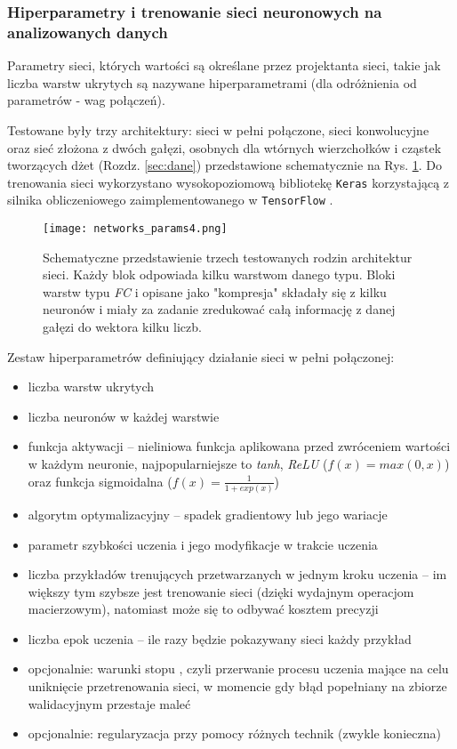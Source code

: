 \subsubsection*{Hiperparametry i trenowanie sieci neuronowych na analizowanych danych}

Parametry sieci, których wartości są określane przez projektanta sieci, takie jak liczba warstw ukrytych są nazywane hiperparametrami (dla odróżnienia od parametrów - wag połączeń).

Testowane były trzy architektury: sieci w pełni połączone, sieci konwolucyjne oraz sieć złożona z dwóch gałęzi, osobnych dla wtórnych wierzchołków i cząstek tworzących dżet (Rozdz. \ref{sec:dane}) przedstawione schematycznie na Rys. \ref{fig:nets-params}.
Do trenowania sieci wykorzystano wysokopoziomową bibliotekę \texttt{Keras} \cite{chollet15} korzystającą z silnika obliczeniowego zaimplementowanego w \texttt{TensorFlow} \cite{tensorflow15}.

\begin{figure}[ht]
	\centering
	\texttt{[image: networks\_params4.png]}
	\caption{Schematyczne przedstawienie trzech testowanych rodzin architektur sieci. Każdy blok odpowiada kilku warstwom danego typu. Bloki warstw typu \textit{FC}  i opisane jako "kompresja" składały się z kilku neuronów i miały za zadanie zredukować całą informację z danej gałęzi do wektora kilku liczb.}
	\label{fig:nets-params}
\end{figure}

\clearpage
Zestaw hiperparametrów definiujący działanie sieci w pełni połączonej: 
\begin{itemize}
	\item liczba warstw ukrytych 
	\item liczba neuronów w każdej warstwie
	\item funkcja aktywacji -- nieliniowa funkcja aplikowana przed zwróceniem wartości w każdym neuronie, najpopularniejsze to \textit{tanh}, \textit{ReLU} ($f(x) = max(0,x)$) oraz funkcja sigmoidalna ($f(x) = \frac{1}{1+exp(x)}$)
	\item algorytm optymalizacyjny -- spadek gradientowy lub jego wariacje
	\item parametr szybkości uczenia i jego modyfikacje w trakcie uczenia
	\item liczba przykładów trenujących przetwarzanych w jednym kroku uczenia  -- im większy tym szybsze jest trenowanie sieci (dzięki wydajnym operacjom macierzowym), natomiast może się to odbywać kosztem precyzji
	\item liczba epok uczenia -- ile razy będzie pokazywany sieci każdy przykład
	\item opcjonalnie: warunki stopu , czyli przerwanie procesu uczenia mające na celu uniknięcie przetrenowania sieci, w momencie gdy błąd popełniany na zbiorze walidacyjnym przestaje maleć
	\item opcjonalnie: regularyzacja przy pomocy różnych technik (zwykle konieczna)
\end{itemize}

